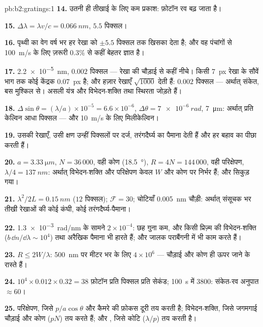 \begin{solution}{pb:b2:gratings:1}
\textbf{14.} उतनी ही तीखाई के लिए कम प्रकाश: फ़ोटॉन रव बढ़ जाता है।

\textbf{15.} $\Delta\lambda = \lambda v/c = \qty{0.066}{nm}$, $5.5$ पिक्सल।

\textbf{16.} पृथ्वी का वेग वर्ष भर हर रेखा को $\pm5.5$ पिक्सल तक
खिसका देता है; और वह पंचांगों से \qty{100}{m/s} के लिए ज़रूरी $0.3\%$ से कहीं
बेहतर ज्ञात है।

\textbf{17.} \qty{2.2e-5}{nm}, $0.002$ पिक्सल --- रेखा की चौड़ाई से कहीं नीचे। किसी
\qty{7}{px} रेखा के सौवें भाग तक कोई केंद्रक \qty{0.07}{px} है; और हज़ार
रेखाएँ $\sqrt{1000}$ देती हैं: $0.002$ पिक्सल --- अर्थात् संकेत, बस मुश्किल से। असली
यंत्र और विभेदन-शक्ति तथा स्थिरता जोड़ते हैं।

\textbf{18.} $\Delta\sin\theta = (\lambda/a) \times 10^{-5} = 6.6 \times 10^{-6}$, $\Delta\theta = \qty{7e-6}{rad}$,
\qty{7}{\micro m}: अर्थात् प्रति केल्विन आधा पिक्सल --- और \qty{10}{m/s} के लिए मिलीकेल्विन।

\textbf{19.} उसकी रेखाएँ, उसी क्षण उन्हीं पिक्सलों पर दर्ज,
तरंगदैर्घ्य का पैमाना देती हैं और हर बहाव का पीछा करती हैं।

\textbf{20.} $a = \qty{3.33}{\micro m}$, $N = 36\,000$, वही कोण (\qty{18.5}{\degree}), $R = 4N
= 144\,000$, वही परिक्षेपण,  $\lambda/4 = \qty{137}{nm}$: अर्थात् विभेदन-शक्ति और
परिक्षेपण केवल $W$ और कोण पर निर्भर हैं; और 
सिकुड़ गया।

\textbf{21.}  $\lambda^2/2L = \qty{0.15}{nm}$ ($12$ पिक्सल); $\mathcal F = 30$; चोटियाँ
\qty{0.005}{nm} चौड़ी: अर्थात् संसूचक भर तीखी रेखाओं की कोई कंघी, कोई
तरंगदैर्घ्य-पैमाना।

\textbf{22.} \qty{1.3e-3}{rad/nm} के सामने $2 \times 10^{-4}$: छह गुना कम, और किसी
प्रिज़्म की विभेदन-शक्ति ($b\,\dd n/\dd\lambda \sim 10^4$) तथा अरैखिक पैमाना भी
हारते हैं; और जालक पराबैंगनी में भी काम करते हैं।

\textbf{23.} $R \le 2W/\lambda$: \qty{500}{nm} पर मीटर भर के लिए $4 \times 10^6$ --- चौड़ाई और
कोण ही ऊपर जाने के रास्ते हैं।

\textbf{24.} $10^4 \times 0.012 \times 0.32 = 38$ फ़ोटॉन प्रति पिक्सल प्रति सेकंड; \qty{100}{s} में
$3800$: संकेत-रव अनुपात $\approx 60$।

\textbf{25.} परिक्षेपण, जिसे $p/a\cos\theta$ और कैमरे की फ़ोकस दूरी तय करती है;
विभेदन-शक्ति, जिसे जगमगाई चौड़ाई और कोण ($pN$) तय करते हैं;
और , जिसे कोटि ($\lambda/p$) तय करती है।
\end{solution}
